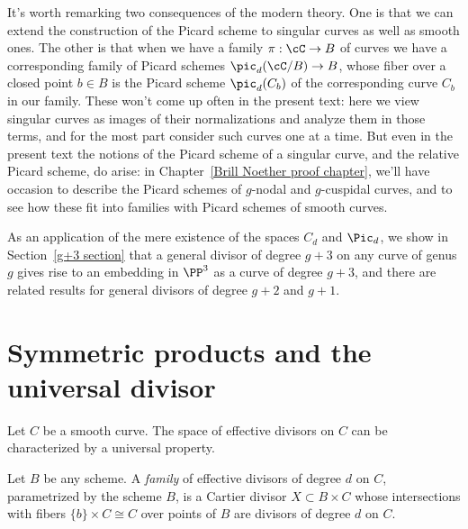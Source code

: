 It's worth remarking two consequences of the modern theory. One is that we can extend the construction of the Picard scheme to singular curves as well as smooth ones. The other is that when we have a family $\pi : \cC \to B$ of curves we have a corresponding family of Picard schemes $\pic_d(\cC/B) \to B$, whose fiber over a closed point $b\in B$ is the Picard scheme $\pic_d(C_b)$ of the corresponding curve $C_b$ in our family.
These won't come up often in the present text: here we view singular curves as images of their normalizations and analyze them in those terms, and for the most part consider such curves one at a time. But even in the present text the notions of the Picard scheme of a singular curve, and the relative Picard scheme, do arise: in Chapter~\ref{Brill Noether proof chapter}, we'll have occasion to describe the Picard schemes of $g$-nodal and $g$-cuspidal curves, and to see how these fit into families with Picard schemes of smooth curves.

As an application of the mere existence of the spaces $C_d$ and $\Pic_d$, we show in Section~\ref{g+3 section} that a general divisor of degree $g+3$ on any curve of genus $g$ gives rise to an embedding in $\PP^3$ as a curve of degree $g+3$, and there are related results for general divisors of degree $g+2$ and $g+1$. 


\section{Symmetric products and the universal divisor}\label{symmetric section}

Let $C$ be a smooth curve. The space of effective divisors on $C$ can be characterized by a universal property. 

\begin{definition}
Let $B$ be any scheme. A \emph{family} of effective divisors of degree $d$ on $C$, parametrized by the scheme $B$, is a Cartier divisor $X\subset B\times C$ whose intersections with fibers $\{b\} \times C \cong C$ over points of $B$ are divisors of degree $d$ on $C$.
\end{definition}

